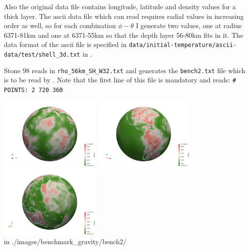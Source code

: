 Also the original data file contains longitude, latitude and density values for 
a thick layer. The ascii data file which \aspect can read requires radial values 
in increasing order as well, 
so for each combination $\phi-\theta$ I generate two values, one at 
radius 6371-81km and one at 6371-55km so that the depth layer 56-80km fits in it.
The data format of the ascii file is specified in 
{\tt data/initial-temperature/ascii-data/test/shell\_3d.txt} in \aspect{}.

Stone 98 reads in {\tt rho\_56km\_SH\_W32.txt} 
and generates the {\tt bench2.txt} file which is to be read by \aspect{}.
Note that the first line of this file is mandatory and reads: 
{\tt \# POINTS: 2 720 360}

\begin{center}
\includegraphics[width=5cm]{./images/benchmark_gravity/bench2/dens1}
\includegraphics[width=5cm]{./images/benchmark_gravity/bench2/dens2}
\includegraphics[width=5cm]{./images/benchmark_gravity/bench2/dens3}\\
{\tiny {\color{gray} in ./images/benchmark\_gravity/bench2/}}
\end{center}


